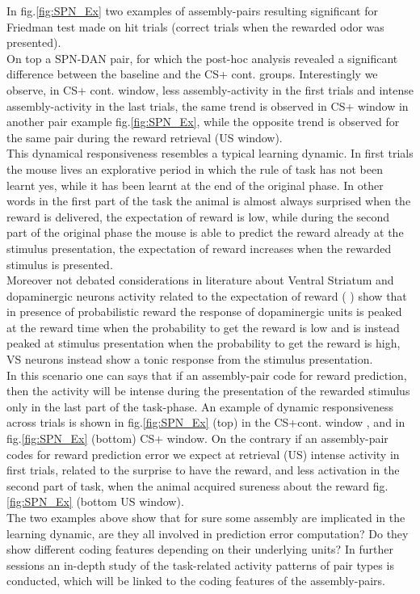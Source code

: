 In fig.\ref{fig:SPN_Ex} two examples of assembly-pairs resulting significant for Friedman test made on hit trials (correct trials when the rewarded odor was presented).\\On top a SPN-DAN pair, for which the post-hoc analysis revealed a significant difference between the baseline and the CS+ cont. groups. Interestingly we observe, in CS+ cont. window, less assembly-activity in the first trials and intense assembly-activity in the last trials, the same trend is observed in CS+ window in another pair example fig.\ref{fig:SPN_Ex}, while the opposite trend is observed for the same pair during the reward retrieval (US window).\\This dynamical responsiveness resembles a typical learning dynamic. In first trials the mouse lives an explorative period in which the rule of task has not been learnt yes, while it has been learnt at the end of the original phase. In other words in the first part of the task the animal is almost always surprised when the reward is delivered, the expectation of reward is low, while during the second part of the original phase the mouse is able to predict the reward already at the stimulus presentation, the expectation of reward increases when the rewarded stimulus is presented.\\Moreover not debated considerations in literature about Ventral Striatum and dopaminergic neurons activity related to the expectation of reward (\cite{Schultz1992} \cite{Schultz} \cite{Fiorillo}) show that in presence of probabilistic reward the response of dopaminergic units is peaked at the reward time when the probability to get the reward is low and is instead peaked at stimulus presentation when the probability to get the reward is high, VS neurons instead show a tonic response from the stimulus presentation.\\In this scenario one can says that if an assembly-pair code for reward prediction, then the activity will be intense during the presentation of the rewarded stimulus only in the last part of the task-phase. An example of dynamic responsiveness across trials is shown in fig.\ref{fig:SPN_Ex} (top) in the CS+cont. window , and in fig.\ref{fig:SPN_Ex} (bottom) CS+ window. On the contrary if an assembly-pair codes for reward prediction error we expect at retrieval (US) intense activity in first trials, related to the surprise to have the reward, and less activation in the second part of task, when the animal acquired sureness about the reward fig.\ref{fig:SPN_Ex} (bottom US window).\\The two examples above show that for sure some assembly are implicated in the learning dynamic, are they all involved in prediction error computation? Do they show different coding features depending on their underlying units? In further sessions an in-depth study of the task-related activity patterns of pair types is conducted, which will be linked to the coding features of the assembly-pairs.\\

